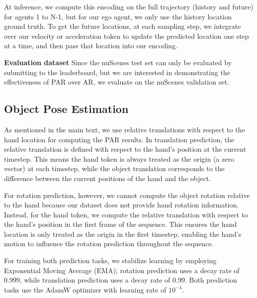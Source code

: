 At inference, we compute this encoding on the full trajectory (history and future) for agents 1 to N-1, but for our ego agent, we only use the history location ground truth. To get the future locations, at each sampling step, we integrate over our velocity or acceleration token to update the predicted location one step at a time, and then pass that location into our encoding.

\medskip \noindent \textbf{Evaluation dataset} Since the nuScenes test set can only be evaluated by submitting to the leaderboard, but we are interested in demonstrating the effectiveness of PAR over AR, we evaluate on the nuScenes validation set.  

\subsection{Object Pose Estimation}
As mentioned in the main text, we use relative translations with respect to the hand location for computing the PAR results. In translation prediction, the relative translation is defined with respect to the hand's position at the current timestep. This means the hand token is always treated as the origin (a zero vector) at each timestep, while the object translation corresponds to the difference between the current positions of the hand and the object.

For rotation prediction, however, we cannot compute the object rotation relative to the hand because our dataset does not provide hand rotation information. Instead, for the hand token, we compute the relative translation with respect to the hand's position in the first frame of the sequence. This ensures the hand location is only treated as the origin in the first timestep, enabling the hand's motion to influence the rotation prediction throughout the sequence.

For training both prediction tasks, we stabilize learning by employing Exponential Moving Average (EMA); rotation prediction uses a decay rate of 0.999, while translation prediction uses a decay rate of 0.99. Both prediction tasks use the AdamW optimizer with learning rate of $10^{-4}$.



